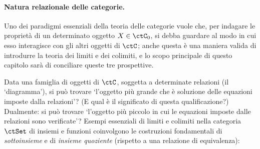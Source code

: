 \paragraph*{Natura relazionale delle categorie.}
Uno dei paradigmi essenziali della teoria delle categorie vuole che, per indagare le proprietà di un determinato oggetto \(X\in\ctC_0\), si debba guardare al modo in cui esso interagisce con gli altri oggetti di \(\ctC\); anche questa è una maniera valida di introdurre la teoria dei limiti e dei colimiti, e lo scopo principale di questo capitolo sarà di conciliare queste tre prospettive.

Data una famiglia di oggetti di \(\ctC\), soggetta a determinate relazioni (il `diagramma'), si può trovare `l'oggetto più grande che è soluzione delle equazioni imposte dalla relazioni'? (E qual è il significato di questa qualificazione?) Dualmente: si può trovare `l'oggetto più piccolo in cui le equazioni imposte dalle relazioni sono verificate'?
\Todo{}
Esempi essenziali di limiti e colimiti nella categoria \(\ctSet\) di insiemi e funzioni coinvolgono le costruzioni fondamentali di \emph{sottoinsieme} e di \emph{insieme quoziente} (rispetto a una relazione di equivalenza):
